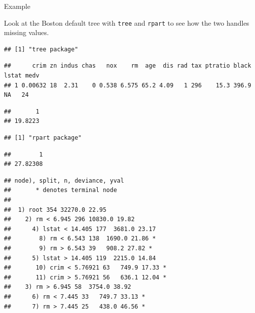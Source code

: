 \documentclass[
  ignorenonframetext,
]{beamer}
\begin{document}
\begin{frame}[fragile]

\begin{block}{Example}

Look at the Boston default tree with \texttt{tree} and \texttt{rpart} to
see how the two handles missing values.

\begin{verbatim}
## [1] "tree package"
\end{verbatim}

\begin{verbatim}
##      crim zn indus chas   nox    rm  age  dis rad tax ptratio black lstat medv
## 1 0.00632 18  2.31    0 0.538 6.575 65.2 4.09   1 296    15.3 396.9    NA   24
\end{verbatim}

\begin{verbatim}
##       1 
## 19.8223
\end{verbatim}

\begin{verbatim}
## [1] "rpart package"
\end{verbatim}

\begin{verbatim}
##        1 
## 27.82308
\end{verbatim}

\begin{verbatim}
## node), split, n, deviance, yval
##       * denotes terminal node
## 
##  1) root 354 32270.0 22.95  
##    2) rm < 6.945 296 10830.0 19.82  
##      4) lstat < 14.405 177  3681.0 23.17  
##        8) rm < 6.543 138  1690.0 21.86 *
##        9) rm > 6.543 39   908.2 27.82 *
##      5) lstat > 14.405 119  2215.0 14.84  
##       10) crim < 5.76921 63   749.9 17.33 *
##       11) crim > 5.76921 56   636.1 12.04 *
##    3) rm > 6.945 58  3754.0 38.92  
##      6) rm < 7.445 33   749.7 33.13 *
##      7) rm > 7.445 25   438.0 46.56 *
\end{verbatim}

\end{block}

\end{frame}
\end{document}
